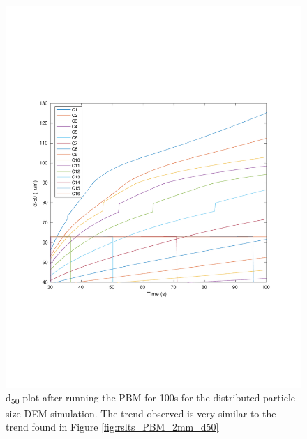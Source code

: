 \documentclass[preprint,11pt,authoryear]{elsarticle}
\begin{document}
\begin{figure}[H]
\centering
\includegraphics[scale=0.5]{rslts_pbm_d50_128_555.pdf}
\caption{d\textsubscript{50} plot after running the PBM for 100s for the distributed particle size DEM 
simulation. The trend observed is very similar to the trend found in Figure \ref{fig:rslts_PBM_2mm_d50}}
\label{fig:rslts_PBM_psd_d50}
\end{figure}
\end{document}
